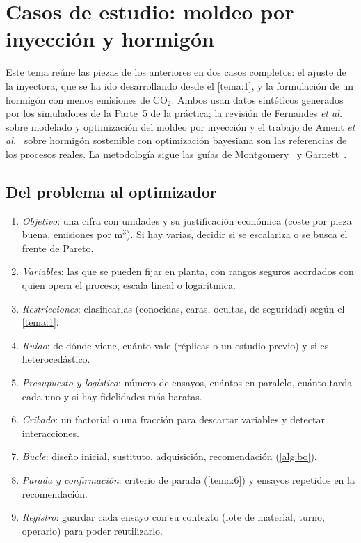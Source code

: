\chapter{Casos de estudio: moldeo por inyección y hormigón}
\label{tema:5}

Este tema reúne las piezas de los anteriores en dos casos completos: el ajuste de la inyectora, que se ha ido desarrollando desde el \cref{tema:1}, y la formulación de un hormigón con menos emisiones de CO$_2$. Ambos usan datos sintéticos generados por los simuladores de la Parte~5 de la práctica; la revisión de Fernandes \emph{et al.}~\cite{fernandes} sobre modelado y optimización del moldeo por inyección y el trabajo de Ament \emph{et al.}~\cite{ament} sobre hormigón sostenible con optimización bayesiana son las referencias de los procesos reales. La metodología sigue las guías de Montgomery~\cite[§1.5]{montgomery} y Garnett~\cite[cap.~9]{garnett}.

\section{Del problema al optimizador}

\begin{algoritmo}\label{alg:lista}
\begin{enumerate}[label=\arabic*.]
  \item \emph{Objetivo}: una cifra con unidades y su justificación económica (coste por pieza buena, emisiones por m$^3$). Si hay varias, decidir si se escalariza o se busca el frente de Pareto.
  \item \emph{Variables}: las que se pueden fijar en planta, con rangos seguros acordados con quien opera el proceso; escala lineal o logarítmica.
  \item \emph{Restricciones}: clasificarlas (conocidas, caras, ocultas, de seguridad) según el \cref{tema:1}.
  \item \emph{Ruido}: de dónde viene, cuánto vale (réplicas o un estudio previo) y si es heterocedástico.
  \item \emph{Presupuesto y logística}: número de ensayos, cuántos en paralelo, cuánto tarda cada uno y si hay fidelidades más baratas.
  \item \emph{Cribado}: un factorial o una fracción para descartar variables y detectar interacciones.
  \item \emph{Bucle}: diseño inicial, sustituto, adquisición, recomendación (\cref{alg:bo}).
  \item \emph{Parada y confirmación}: criterio de parada (\cref{tema:6}) y ensayos repetidos en la recomendación.
  \item \emph{Registro}: guardar cada ensayo con su contexto (lote de material, turno, operario) para poder reutilizarlo.
\end{enumerate}
\end{algoritmo}

